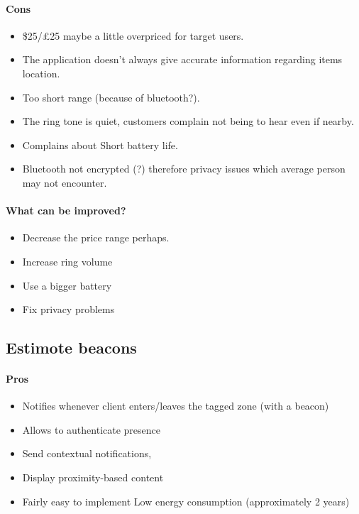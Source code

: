 \documentclass[12pt,a4paper]{article}
\begin{document}
\begin{appendices}
          \paragraph{Cons} 
            \begin{itemize}
              \item \$25/£25 maybe a little overpriced for target users.
              \item The application doesn’t always give accurate information regarding items location.
              \item Too short range (because of bluetooth?).
              \item The ring tone is quiet, customers complain not being to hear even if nearby.
              \item Complains about Short battery life.
              \item Bluetooth not encrypted (?) therefore privacy issues which average person may not encounter.
            \end{itemize}
          \paragraph{What can be improved?}
            \begin{itemize}
              \item Decrease the price range perhaps.
              \item Increase ring volume
              \item Use a bigger battery
              \item Fix privacy problems
            \end{itemize}

        \subsection{Estimote beacons}
          \paragraph{Pros}
            \begin{itemize}
              \item Notifies whenever client enters/leaves the tagged zone (with a beacon)
              \item Allows to authenticate presence
              \item Send contextual notifications,
              \item Display proximity-based content
              \item Fairly easy to implement Low energy consumption (approximately 2 years)
            \end{itemize} 

\end{appendices}
\end{document}
